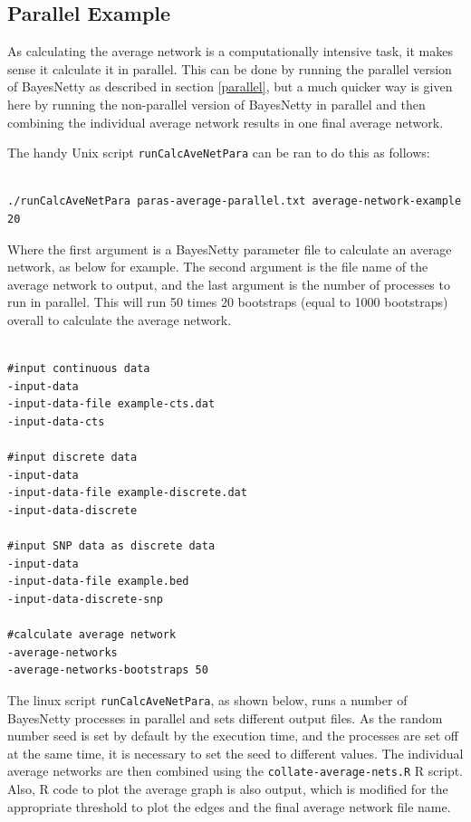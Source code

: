 \documentclass[a4paper,12pt]{article}
\newcommand{\code}[1]{{\footnotesize{{\tt #1}}}}
\begin{document}

\subsection{Parallel Example}
\label{average-network-parallel}

As calculating the average network is a computationally intensive task, it makes sense it calculate it in parallel. This can be done by running the parallel version of BayesNetty as described in  section \ref{parallel}, but a much quicker way is given here by running the non-parallel version of BayesNetty in parallel and then combining the individual average network results in one final average network. 

The handy Unix script \code{runCalcAveNetPara} can be ran to do this as follows: 
\vspace{0.35cm} \begin{lstlisting}

./runCalcAveNetPara paras-average-parallel.txt average-network-example 20

\end{lstlisting} \vspace{0.35cm}
Where the first argument is a BayesNetty parameter file to calculate an average network, as below for example. The second argument is the file name of the average network to output, and the last argument is the number of processes to run in parallel. This will run 50 times 20 bootstraps (equal to 1000 bootstraps) overall to calculate the average network. 
\vspace{0.35cm} \begin{lstlisting}

#input continuous data
-input-data
-input-data-file example-cts.dat
-input-data-cts

#input discrete data
-input-data
-input-data-file example-discrete.dat
-input-data-discrete

#input SNP data as discrete data
-input-data
-input-data-file example.bed
-input-data-discrete-snp

#calculate average network
-average-networks
-average-networks-bootstraps 50

\end{lstlisting} \vspace{0.35cm}
The linux script \code{runCalcAveNetPara}, as shown below, runs a number of BayesNetty processes in parallel and sets different output files. As the random number seed is set by default by the execution time, and the processes are set off at the same time, it is necessary to set the seed to different values. The individual average networks are then combined using the \code{collate-average-nets.R} R script. Also, R code to plot the average graph is also output, which is modified for the appropriate threshold to plot the edges and the final average network file name. 
\end{document}
